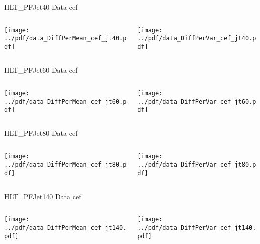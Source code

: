 \documentclass[9pt]{beamer}
\begin{document}
\begin{frame}[t]{HLT\_PFJet40 Data cef}
\begin{columns}[T]
  \begin{column}{.5\textwidth}
  \texttt{[image: ../pdf/data\_DiffPerMean\_cef\_jt40.pdf]}
  \end{column}
  \begin{column}{.5\textwidth}
  \texttt{[image: ../pdf/data\_DiffPerVar\_cef\_jt40.pdf]}
  \end{column}
\end{columns}
\end{frame}

\begin{frame}[t]{HLT\_PFJet60 Data cef}
\begin{columns}[T]
  \begin{column}{.5\textwidth}
  \texttt{[image: ../pdf/data\_DiffPerMean\_cef\_jt60.pdf]}
  \end{column}
  \begin{column}{.5\textwidth}
  \texttt{[image: ../pdf/data\_DiffPerVar\_cef\_jt60.pdf]}
  \end{column}
\end{columns}
\end{frame}

\begin{frame}[t]{HLT\_PFJet80 Data cef}
\begin{columns}[T]
  \begin{column}{.5\textwidth}
  \texttt{[image: ../pdf/data\_DiffPerMean\_cef\_jt80.pdf]}
  \end{column}
  \begin{column}{.5\textwidth}
  \texttt{[image: ../pdf/data\_DiffPerVar\_cef\_jt80.pdf]}
  \end{column}
\end{columns}
\end{frame}

\begin{frame}[t]{HLT\_PFJet140 Data cef}
\begin{columns}[T]
  \begin{column}{.5\textwidth}
  \texttt{[image: ../pdf/data\_DiffPerMean\_cef\_jt140.pdf]}
  \end{column}
  \begin{column}{.5\textwidth}
  \texttt{[image: ../pdf/data\_DiffPerVar\_cef\_jt140.pdf]}
  \end{column}
\end{columns}
\end{frame}
\end{document}

